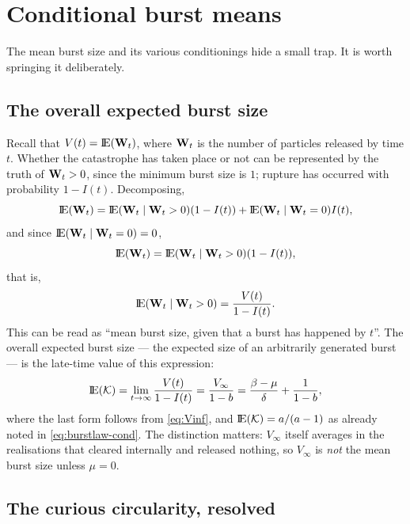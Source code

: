 \section{Conditional burst means}
\label{sec:cond-means}

The mean burst size and its various conditionings hide a small trap. It is
worth springing it deliberately.

\subsection{The overall expected burst size}

Recall that $V(t)={\rm I}\!{\rm E}({{\bf W}_t})$, where ${{\bf W}_t}$ is the number of particles
released by time $t$. Whether the catastrophe has taken place or not can be
represented by the truth of ${{\bf W}_t}>0$, since the minimum burst size is $1$;
rupture has occurred with probability $1-I(t)$. Decomposing,
$${\rm I}\!{\rm E}({{\bf W}_t}) = {\rm I}\!{\rm E}({{\bf W}_t}\mid{{\bf W}_t} > 0)(1-I(t)) + {{\rm I}\!{\rm E}({{\bf W}_t} \mid {{\bf W}_t} = 0)}I(t),$$
and since ${{\rm I}\!{\rm E}({{\bf W}_t} \mid {{\bf W}_t} = 0)} = 0$,
$${\rm I}\!{\rm E}({{\bf W}_t}) = {\rm I}\!{\rm E}({{\bf W}_t}\mid{{\bf W}_t} > 0)(1-I(t)),$$
that is,
\begin{equation}
{\rm I}\!{\rm E}({{\bf W}_t}\mid{{\bf W}_t} > 0) = \frac{V(t)}{1-I(t)}.
\label{eq:VoverI}
\end{equation}
This can be read as ``mean burst size, given that a burst has happened by
$t$''. The overall expected burst size --- the expected size of an
arbitrarily generated burst --- is the late-time value of this expression:
\begin{equation}
{\rm I}\!{\rm E}(\mathcal{K})=\lim_{t\to\infty}\frac{V(t)}{1-I(t)}
=\frac{V_\infty}{1-b}
=\frac{\beta-\mu}{\delta}+\frac{1}{1-b},
\label{eq:meanK}
\end{equation}
where the last form follows from \eqref{eq:Vinf}, and ${\rm I}\!{\rm E}(\mathcal{K})=a/(a-1)$
as already noted in \eqref{eq:burstlaw-cond}. The distinction matters:
$V_\infty$ itself averages in the realisations that cleared internally and
released nothing, so $V_\infty$ is \emph{not} the mean burst size unless
$\mu=0$.

\subsection{The curious circularity, resolved}
\label{sec:circularity}

